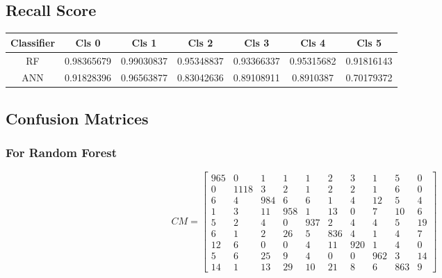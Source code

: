 \documentclass[12pt,a4paper]{article}
\begin{document}
\subsection{Recall Score}
\begin{center}
\begin{tabular}{ || c c c c c c c|| } 
\hline
Classifier & Cls 0 & Cls 1 & Cls 2 & Cls 3 & Cls 4 & Cls 5\\
 \hline
 RF & 0.98365679 & 0.99030837 & 0.95348837 & 0.93366337 & 0.95315682 &  0.91816143\\ 
\hline
ANN & 0.91828396 & 0.96563877 & 0.83042636 & 0.89108911 & 0.8910387 & 0.70179372\\
 \hline
\end{tabular}
\end{center}
\subsection{Confusion Matrices}
\subsubsection{For Random Forest}

\[
CM=
  \begin{bmatrix}
   965  &  0 &   1   & 1   & 1  &  2  &  3  &  1  &  5  &  0\\
0 & 1118  &  3  &  2  &  1   & 2  &  2  &  1 &   6 &   0\\
6  &  4 & 984 &   6  &  6  &  1  &  4 &  12  &  5  &  4\\
1  &  3  &  11  &  958  &  1  &  13  &  0  &  7 &   10  &   6\\
5  &   2 &   4  &  0 &  937 &   2 &   4  &  4 &   5 &  19\\
6   &  1  &   2  &  26  &  5  &  836  &  4   &  1  &   4 &   7\\
12  &  6  &  0 &   0  &  4 &  11 &  920  &   1  &  4  &  0\\
5   &  6 &  25  &   9  &  4  &  0  &  0 & 962  &  3 &  14\\
14  &  1 &  13 &  29 &  10 &  21 &   8 &   6 & 863 &    9
  \end{bmatrix}
\]
\end{document}
